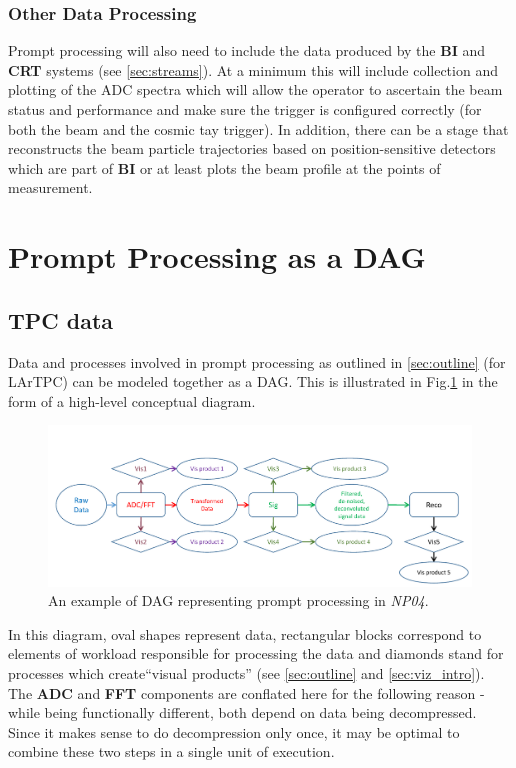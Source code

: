 \documentclass[pdftex,12pt,letter]{article}
\newcommand{\expname}{\textit{NP04}\xspace}
\begin{document}
\subsubsection{Other Data Processing}
\label{sec:otherdata}
Prompt processing will also need to include the data produced by the \textbf{BI} and \textbf{CRT}
systems (see \ref{sec:streams}). At a minimum this will include collection and plotting of the
ADC spectra which will allow the operator to ascertain the beam status and performance
and make sure the trigger is configured correctly (for both the beam and the cosmic tay trigger).
In addition, there can be a stage that reconstructs the beam particle trajectories based on
position-sensitive  detectors which are part of \textbf{BI} or at least plots the beam profile
at the points of measurement.



\section{Prompt Processing as a DAG}
\label{sec:dag}
\subsection{TPC data}
Data and processes involved in prompt processing as outlined in \ref{sec:outline} (for LArTPC) can be
modeled together as a DAG. This is illustrated in Fig.\ref{fig:dag1}
in the form of a high-level conceptual diagram.

\begin{figure}[tbh]
  \centering
  \includegraphics[width=1.0\textwidth]{figures/prompt_dag_2.pdf}
  \caption{An example of DAG representing prompt processing in \expname.}
  \label{fig:dag1}
\end{figure}
\noindent In this diagram, oval shapes represent data, rectangular blocks correspond to
elements of workload responsible for processing the data and diamonds stand for processes
which create``visual products'' (see \ref{sec:outline} and \ref{sec:viz_intro}).
The \textbf{ADC} and \textbf{FFT} components are conflated here for the following reason - while being functionally
different, both depend on data being decompressed. Since it makes sense to do decompression only once, it may
be optimal to combine these two steps in a single unit of execution.
\end{document}
